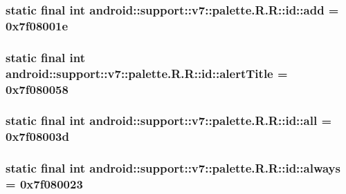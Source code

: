 \hypertarget{classandroid_1_1support_1_1v7_1_1palette_1_1_r_1_1id_e253d302b782d1c5465138842b9ef7b7}{
\subsubsection[{add}]{\setlength{\rightskip}{0pt plus 5cm}static final int android::support::v7::palette.R.R::id::add = 0x7f08001e}}
\label{classandroid_1_1support_1_1v7_1_1palette_1_1_r_1_1id_e253d302b782d1c5465138842b9ef7b7}


\hypertarget{classandroid_1_1support_1_1v7_1_1palette_1_1_r_1_1id_e782a5ac18b6b07a7cb42f2b391d3f3d}{
\subsubsection[{alertTitle}]{\setlength{\rightskip}{0pt plus 5cm}static final int android::support::v7::palette.R.R::id::alertTitle = 0x7f080058}}
\label{classandroid_1_1support_1_1v7_1_1palette_1_1_r_1_1id_e782a5ac18b6b07a7cb42f2b391d3f3d}


\hypertarget{classandroid_1_1support_1_1v7_1_1palette_1_1_r_1_1id_c658b8337d6b933962911d3b20d0bbb6}{
\subsubsection[{all}]{\setlength{\rightskip}{0pt plus 5cm}static final int android::support::v7::palette.R.R::id::all = 0x7f08003d}}
\label{classandroid_1_1support_1_1v7_1_1palette_1_1_r_1_1id_c658b8337d6b933962911d3b20d0bbb6}


\hypertarget{classandroid_1_1support_1_1v7_1_1palette_1_1_r_1_1id_cab60f45ece9a778ed0ae5f1ebb8b06c}{
\subsubsection[{always}]{\setlength{\rightskip}{0pt plus 5cm}static final int android::support::v7::palette.R.R::id::always = 0x7f080023}}
\label{classandroid_1_1support_1_1v7_1_1palette_1_1_r_1_1id_cab60f45ece9a778ed0ae5f1ebb8b06c}


